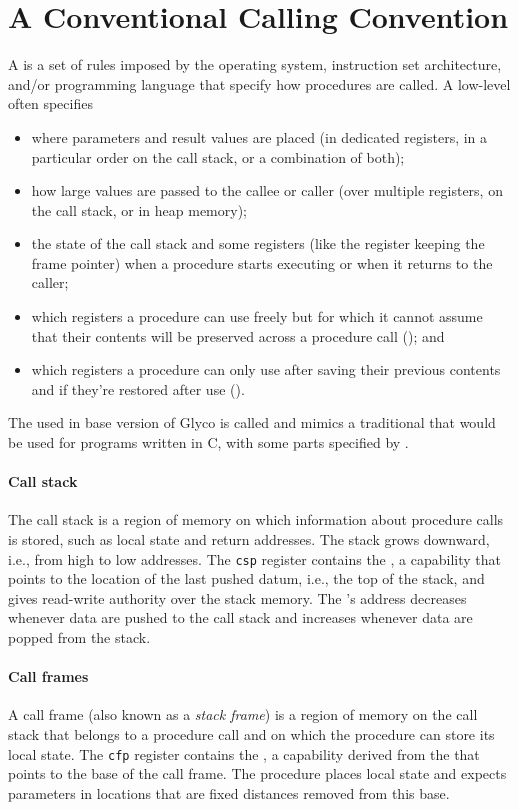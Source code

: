 \documentclass[main.tex]{subfiles}
\begin{document}
\section{A Conventional Calling Convention}
A  is a set of rules imposed by the operating system, instruction set architecture, and/or programming language that specify how procedures are called. A low-level  often specifies
\begin{itemize}[noitemsep]
	\item where parameters and result values are placed (in dedicated registers, in a particular order on the call stack, or a combination of both);
	\item how large values are passed to the callee or caller (over multiple registers, on the call stack, or in heap memory);
	\item the state of the call stack and some registers (like the register keeping the frame pointer) when a procedure starts executing or when it returns to the caller;
	\item which registers a procedure can use freely but for which it cannot assume that their contents will be preserved across a procedure call (\textbf{}); and
	\item which registers a procedure can only use after saving their previous contents and if they're restored after use (\textbf{}).
\end{itemize}

The  used in base version of Glyco is called \textbf{} and mimics a traditional  that would be used for programs written in C, with some parts specified by \cite[chapter~25]{riscv}.

\paragraph{Call stack} The call stack is a region of memory on which information about procedure calls is stored, such as local state and return addresses. The stack grows downward, i.e., from high to low addresses. The \texttt{csp} register contains the \textbf{}, a capability that points to the location of the last pushed datum, i.e., the top of the stack, and gives read-write authority over the stack memory. The 's address decreases whenever data are pushed to the call stack and increases whenever data are popped from the stack.

\paragraph{Call frames} A call frame (also known as a \emph{stack frame}) is a region of memory on the call stack that belongs to a procedure call and on which the procedure can store its local state. The \texttt{cfp} register contains the \textbf{}, a capability derived from the  that points to the base of the call frame. The procedure places local state and expects parameters in locations that are fixed distances removed from this base.
\end{document}
